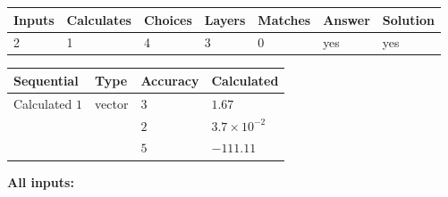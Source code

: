 \documentclass[12pt]{article}
\begin{document}
 
 
\noindent{}
 
 

 
 
\vspace{0.3in}
   
   
   
   
\noindent\begin{tabular}{|l|l|l|l|l|l|l|}
 \hline
Inputs & Calculates & Choices & Layers & Matches & Answer & Solution \\ \hline
           2 & 
           1 & 
           4
  & 
           3 & 
           0 & 
  yes & 
  yes 
  \\ \hline
 \end{tabular}
   
   
   
   
\noindent{}
   
   
  
  
\noindent\begin{tabular}{|l|l|l|l|}
\hline
 Sequential & Type & Accuracy & Calculated \\ 
\hline
 
 
  Calculated $           1$ & vector &  
  $           3 $ 
 &  $ 1.67 $ 
 \\    
  & & 
  $           2 $ 
 &  $ 3.7 \times 10^{-2} $ 
 \\    
  & & 
  $           5 $ 
 &  $ -111.11 $ 
 \\  \hline  
 \end{tabular}
   
   
   
   
\noindent\vspace{0.1in}\hspace{-0.08in} {\textbf{\Large{All inputs: }}}
   
   
  
\end{document}

